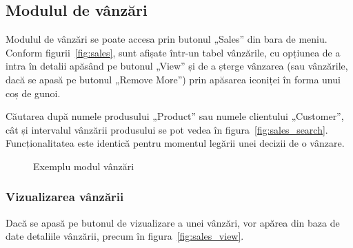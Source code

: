 	\subsection{Modulul de vânzări}

		Modulul de vânzări se poate accesa prin butonul „Sales” din bara de meniu.
		Conform figurii~\ref{fig:sales}, sunt afișate într-un tabel vânzările, cu opțiunea de a intra în detalii apăsând pe butonul „View” și de a șterge vânzarea (sau vânzările, dacă se apasă pe butonul „Remove More”) prin apăsarea iconiței în forma unui coș de gunoi.

		Căutarea după numele produsului „Product” sau numele clientului „Customer”, cât și intervalul vânzării produsului se pot vedea în figura~\ref{fig:sales_search}.
		Funcționalitatea este identică pentru momentul legării unei decizii de o vânzare.

	\begin{figure}
		\centering
		\caption{Exemplu modul vânzări}
	\end{figure}


		\subsubsection{Vizualizarea vânzării}

			Dacă se apasă pe butonul de vizualizare a unei vânzări, vor apărea din baza de date detaliile vânzării, precum în figura~\ref{fig:sales_view}.

